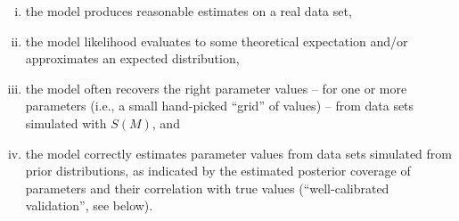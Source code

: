 \documentclass[oneside]{article}
\begin{document}
\begin{enumerate}[i.]
  \item the model produces reasonable estimates on a real data set,
  \item the model likelihood evaluates to some theoretical
    expectation and/or approximates an expected distribution,
  \item the model often recovers the right parameter
    values -- for one or more parameters (i.e., a small hand-picked
    ``grid'' of values) -- from data sets simulated with $S(M)$, and
\item the model correctly estimates parameter values from data sets
  simulated from prior distributions, as indicated by the estimated
  posterior coverage of parameters and their correlation with true
  values (``well-calibrated validation'', see below). {\color{red}{If
      we want to talk about the next level -- using other HPDs, we can
      add it as the 5th possibility and expand on it below}}
\end{enumerate}


\end{document}
